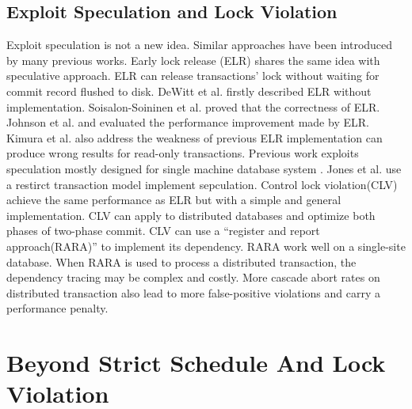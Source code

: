\documentclass[conference]{IEEEtran}
\begin{document}
\subsection{Exploit Speculation and Lock Violation}
Exploit speculation is not a new idea.
Similar approaches have been introduced by many previous works.
Early lock release (ELR)
\cite{ELR:dewitt_implementation_1984}\cite{PS2PL:conf/icdt/Soisalon-SoininenY95}
\cite{Aether:journals/pvldb/JohnsonPSAA10}
\cite{EfficientLocking:conf/vldb/KimuraGK12}
\cite{Actor-Oriented-DB:conf/icde/Bernstein18}
shares the same idea with speculative approach. 
ELR can release transactions' lock without waiting for commit record flushed to disk.
DeWitt et al.\cite{ELR:dewitt_implementation_1984} firstly described ELR
 without implementation.
Soisalon-Soininen et al.\cite{PS2PL:conf/icdt/Soisalon-SoininenY95} proved that the correctness of ELR.
Johnson et al.\cite{Aether:journals/pvldb/JohnsonPSAA10} and\cite{EfficientLocking:conf/vldb/KimuraGK12} evaluated the performance improvement made by ELR.
Kimura et al.\cite{EfficientLocking:conf/vldb/KimuraGK12}\cite{Aether:journals/pvldb/JohnsonPSAA10} also address the weakness of previous ELR implementation\cite{ELR:dewitt_implementation_1984} can produce wrong results for read-only transactions.
Previous work exploits speculation mostly designed for single machine database system
\cite{PS2PL:conf/icdt/Soisalon-SoininenY95}
\cite{Aether:journals/pvldb/JohnsonPSAA10}
\cite{EfficientLocking:conf/vldb/KimuraGK12}.
Jones et al.\cite{LowOverheadCC:conf/sigmod/JonesAM10} use a restirct transaction model\cite{H-store:journals/pvldb/KallmanKNPRZJMSZHA08} implement sepculation.
Control lock violation(CLV)\cite{CLV:conf/sigmod/GraefeLKTV13} achieve the same performance as ELR but with a simple and general implementation.
CLV can apply to distributed databases and optimize both phases of two-phase commit.
CLV can use a ``register and report approach(RARA)''\cite{HeckatonMVCC:journals/pvldb/LarsonBDFPZ11} to implement its dependency.
RARA work well on a single-site database.
When RARA is used to process a distributed transaction, the dependency tracing may be complex and costly.
More cascade abort rates on distributed transaction also lead to more false-positive violations and carry a performance penalty.


\section{Beyond Strict Schedule And Lock Violation}
\label{sec:non_strict}
\end{document}
